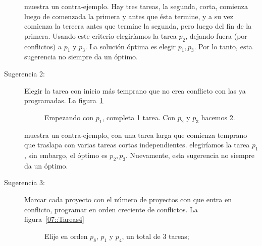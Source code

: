 \begin{example}
\begin{description}
\begin{figure}[ht]
      \end{figure}
      muestra un contra-ejemplo.
      Hay tres tareas,
      la segunda,
      corta,
      comienza luego de comenzada la primera y antes que ésta termine,
      y a su vez comienza la tercera antes que termine la segunda,
      pero luego del fin de la primera.
      Usando este criterio
      elegiríamos la tarea \(p_2\),
      dejando fuera
      (por conflictos)
      a \(p_1\) y \(p_3\).
      La solución óptima es elegir \(p_1, p_3\).
      Por lo tanto,
      esta sugerencia no siempre da un óptimo.
    \item[Sugerencia 2:]
      Elegir la tarea con inicio más temprano
      que no crea conflicto con las ya programadas.
      La figura~\ref{07::Tareas3}
      \begin{figure}[ht]
        \centering
        \caption{Empezando con \(p_1\), completa \num{1} tarea.
                 Con \(p_2\) y \(p_3\) hacemos \num{2}.}
        \label{07::Tareas3}
      \end{figure}
      muestra un contra-ejemplo,
      con una tarea larga que comienza temprano
      que traslapa con varias tareas cortas independientes.
      elegiríamos la tarea \(p_1\),
      sin embargo,
      el óptimo es \(p_2, p_3\).
      Nuevamente,
      esta sugerencia no siempre da un óptimo.
    \item[Sugerencia 3:]
      Marcar cada proyecto con el número de proyectos
      con que entra en conflicto,
      programar en orden creciente de conflictos.
      La figura~\ref{07::Tareas4}
      \begin{figure}[ht]
        \centering
        \caption{Elije en orden \(p_8\), \(p_1\)
                 y \(p_4\), un total de \num{3} tareas;
}
\end{figure}
\end{description}
\end{example}
